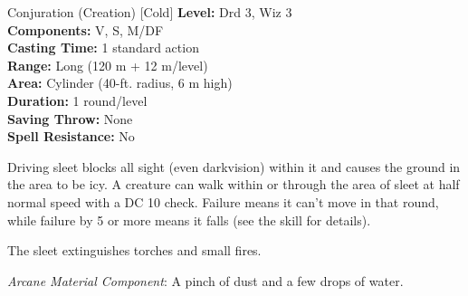 {Conjuration (Creation) [Cold]}
{
	\textbf{Level:}
	Drd 3, Wiz 3\\
	\textbf{Components:}
	V, S, M/DF\\
	\textbf{Casting Time:}
	1 standard action\\
	\textbf{Range:}
	Long (120 m + 12 m/level)\\
	\textbf{Area:}
	Cylinder (40-ft. radius, 6 m high)\\
	\textbf{Duration:}
	1 round/level\\
	\textbf{Saving Throw:}
	None\\
	\textbf{Spell Resistance:}
	No\\
}
{
	Driving sleet blocks all sight (even darkvision) within it and causes the ground in the area to be icy. A creature can walk within or through the area of sleet at half normal speed with a DC 10  check. Failure means it can't move in that round, while failure by 5 or more means it falls (see the  skill for details).

	The sleet extinguishes torches and small fires.

	\textit{Arcane Material Component}:
	A pinch of dust and a few drops of water.

}
